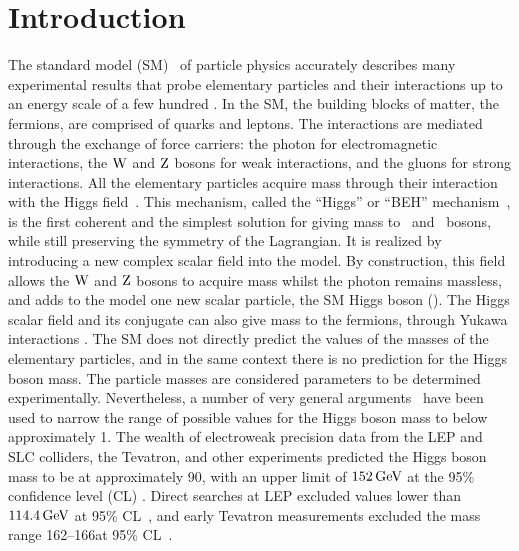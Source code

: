 \documentclass[11pt,twoside,a4paper,cmspaper,final,collab]{cms-tdr}
\begin{document}
\section{Introduction}\label{sec:introduction}
The standard model (SM)~\cite{Glashow:1961tr,Weinberg:1967tq,sm_salam} of particle physics accurately
describes many experimental results that probe elementary particles and their interactions up to
an energy scale of a few hundred \GeVns \cite{EWKlimits}.
In the SM, the building blocks of matter, the fermions, are comprised of quarks and leptons.
The interactions are mediated through the exchange of force carriers: the photon for electromagnetic
interactions, the $\mathrm{W}$ and $\mathrm{Z}$ bosons for weak interactions, and the gluons for strong interactions.
All the elementary particles acquire mass through their interaction with the Higgs
field~\cite{Englert:1964et,Higgs:1964ia,Higgs:1964pj,Guralnik:1964eu,Higgs:1966ev,Kibble:1967sv,Nambu:1961tp,NambuNobel,GellMann:1960np}.
This mechanism, called the ``Higgs'' or ``BEH''
 mechanism~\cite{Englert:1964et,Higgs:1964ia,Higgs:1964pj,Guralnik:1964eu,Higgs:1966ev,Kibble:1967sv},
is the first coherent and the simplest solution for giving mass to \PW\ and \cPZ\ bosons, while still preserving the symmetry of the
Lagrangian. It is realized by introducing a new complex scalar field into the
model. By construction,  this field allows the $\mathrm{W}$ and $\mathrm{Z}$ bosons to
acquire mass whilst the photon remains massless, and adds to the model one new scalar particle, the SM Higgs boson (\PH).
The Higgs scalar field and its conjugate can also give mass to the fermions,
through Yukawa interactions \cite{Nambu:1961tp,NambuNobel,GellMann:1960np}.
The SM does not directly predict the values of the masses of the elementary particles,
and in the same context there is no prediction for the Higgs boson mass.
The particle masses are considered parameters to be determined experimentally.
Nevertheless, a number of very general arguments~\cite{Cornwall:1973tb,Cornwall:1974km,LlewellynSmith:1973ey,Lee:1977eg}
have been used to narrow the range of possible values for the Higgs
boson mass to below approximately 1\TeV. The wealth of electroweak precision
data from the LEP and SLC colliders, the Tevatron, and other experiments
predicted the Higgs boson mass to be at approximately 90\GeV, with an upper limit of $152\,\text{Ge\hspace{-.08em}V}$ at
the 95\% confidence level (CL) \cite{EWKlimits}.  Direct searches at LEP excluded values lower
than $114.4\,\text{Ge\hspace{-.08em}V}$ at 95\% CL~\cite{LEPlimits}, and early Tevatron measurements
excluded the mass range 162--166\GeV at 95\%
CL~\cite{TEVHIGGS_2010}.
\end{document}
